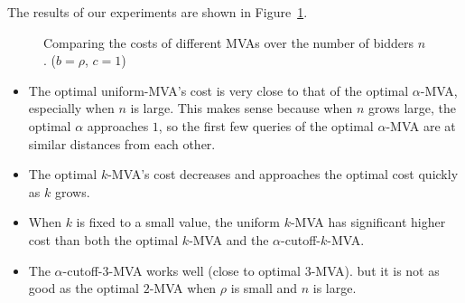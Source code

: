 The results of our experiments are shown in Figure~\ref{fig:cost_comparisons}.
\begin{figure}
\centering
    \caption{Comparing the costs of different MVAs over the number of bidders $n$. ($b = \rho$, $c=1$)}
    \label{fig:cost_comparisons}
\end{figure}
\begin{itemize}
\item 
The optimal uniform-MVA's cost is very close to that of the optimal $\alpha$-MVA,
especially when $n$ is large. This makes sense because when $n$ grows
large, the optimal $\alpha$ approaches $1$, so the first few queries of
the optimal $\alpha$-MVA are at similar distances from each other.
%
\item The optimal $k$-MVA's cost decreases and approaches the optimal cost quickly
as $k$ grows.
\item When $k$ is fixed to a small value, 
the uniform $k$-MVA  has significant higher cost than both the optimal
$k$-MVA and the $\alpha$-cutoff-$k$-MVA.
\item The $\alpha$-cutoff-$3$-MVA works well (close to optimal $3$-MVA).
but it is not
as good as  the optimal $2$-MVA when $\rho$ is small and $n$ is large. 
\end{itemize}
